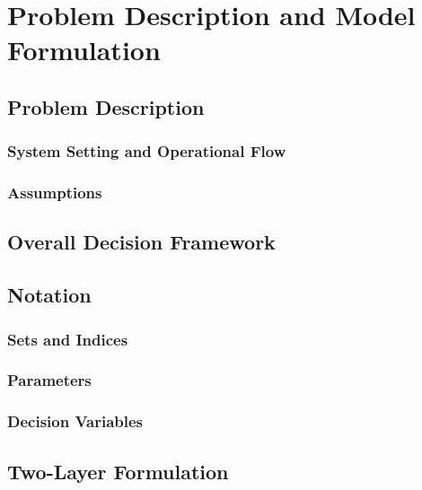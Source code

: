 %
%
%

\chapter{Problem Description and Model Formulation}
\label{ch:model}

\section{Problem Description}
\label{sec:model-problem}

\subsection{System Setting and Operational Flow}
\label{sec:model-setting}

\subsection{Assumptions}
\label{sec:model-assumptions}

\section{Overall Decision Framework}
\label{sec:model-framework}

\section{Notation}
\label{sec:model-notation}

\subsection{Sets and Indices}
\label{sec:model-sets}

\subsection{Parameters}
\label{sec:model-parameters}

\subsection{Decision Variables}
\label{sec:model-variables}

\section{Two-Layer Formulation}
\label{sec:model-twolayer}

